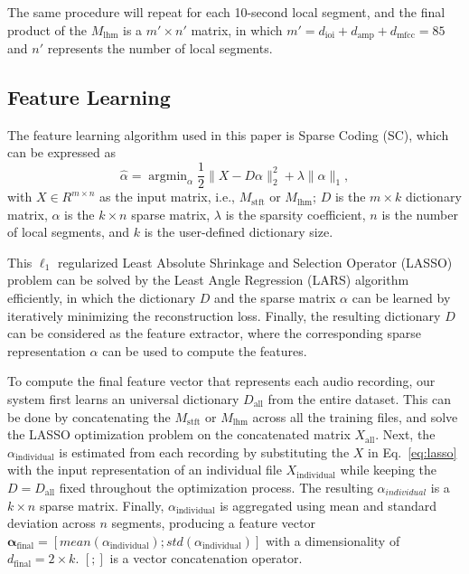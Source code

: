\documentclass[conference]{IEEEtran}
\begin{document}
The same procedure will repeat for each 10-second local segment, and the final product of the $M_\mathrm{lhm}$ is a $m' \times n'$ matrix,  in which $m' = d_\mathrm{ioi} + d_\mathrm{amp} + d_\mathrm{mfcc} = 85$ and $n'$ represents the number of local segments.


\subsection{Feature Learning}\label{subsec:feat_learn}
The feature learning algorithm used in this paper is Sparse Coding (SC), which can be expressed as %
\begin{equation}\label{eq:lasso}
\hat{\alpha} = \mathop{\mathrm{argmin}}_\alpha \frac{1}{2} \| X - D\alpha \|_{2}^{2} + \lambda \| \alpha \|_{1}, 
\end{equation}
%
with $X \in R^{ m \times n}$ as the input matrix, i.e., $M_\mathrm{stft}$ or $M_\mathrm{lhm}$; $D$ is the $m \times k$ dictionary matrix, $\alpha$ is the $k \times n$ sparse matrix, $\lambda$ is the sparsity coefficient, $n$ is the number of local segments, and $k$ is the user-defined dictionary size. 

This $\ell_1$ regularized Least Absolute Shrinkage and Selection Operator (LASSO) problem can be solved by the Least Angle Regression (LARS) algorithm efficiently\cite{Efron2004}, in which the dictionary $D$ and the sparse matrix $\alpha$ can be learned by iteratively minimizing the reconstruction loss. Finally, the resulting dictionary $D$ can be considered as the feature extractor, where the corresponding sparse representation $\alpha$ can be used to compute the features. 

To compute the final feature vector that represents each audio recording, our system first learns an universal dictionary $D_\mathrm{all}$ from the entire dataset. This can be done by concatenating the $M_\mathrm{stft}$ or $M_\mathrm{lhm}$ across all the training files, and solve the LASSO optimization problem on the concatenated matrix $X_\mathrm{all}$. Next, the $\alpha_\mathrm{individual}$ is estimated from each recording by substituting the $X$ in Eq.~\ref{eq:lasso} with the input representation of an individual file $X_\mathrm{individual}$ while keeping the $D = D_\mathrm{all}$ fixed throughout the optimization process. The resulting $\alpha_{individual}$ is a $k \times n$ sparse matrix. Finally, $\alpha_\mathrm{individual}$ is aggregated using mean and standard deviation across $n$ segments, producing a feature vector $\mathbf{\alpha_\mathrm{final}} = [mean(\alpha_\mathrm{individual}); std(\alpha_\mathrm{individual})]$ with a dimensionality of $d_\mathrm{final} = 2 \times k$. $[ ; ]$ is a vector concatenation operator.
\end{document}
